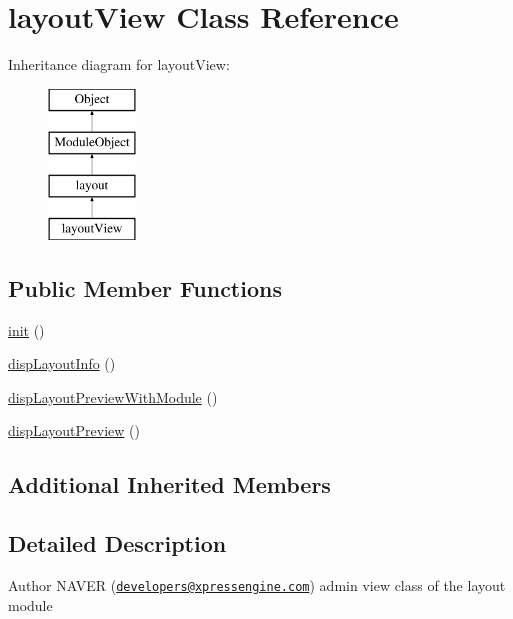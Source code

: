 \hypertarget{classlayoutView}{\section{layout\+View Class Reference}
\label{classlayoutView}
}
Inheritance diagram for layout\+View\+:\begin{figure}[H]
\begin{center}
\leavevmode
\includegraphics[height=4.000000cm]{classlayoutView}
\end{center}
\end{figure}
\subsection*{Public Member Functions}
\begin{DoxyCompactItemize}
\item 
\hyperlink{classlayoutView_ad61f59b8dd10b1b97ebfdcf7d9c230da}{init} ()
\item 
\hyperlink{classlayoutView_a7e82f54644ad872c39e708449b6fea29}{disp\+Layout\+Info} ()
\item 
\hyperlink{classlayoutView_a9d6c6bcdcf6ce58534d2f49f3fb89fce}{disp\+Layout\+Preview\+With\+Module} ()
\item 
\hyperlink{classlayoutView_ae61b21bdcf9e655ac2d1dab95ba96519}{disp\+Layout\+Preview} ()
\end{DoxyCompactItemize}
\subsection*{Additional Inherited Members}


\subsection{Detailed Description}
\begin{DoxyAuthor}{Author}
N\+A\+V\+E\+R (\href{mailto:developers@xpressengine.com}{\tt developers@xpressengine.\+com}) admin view class of the layout module 
\end{DoxyAuthor}


